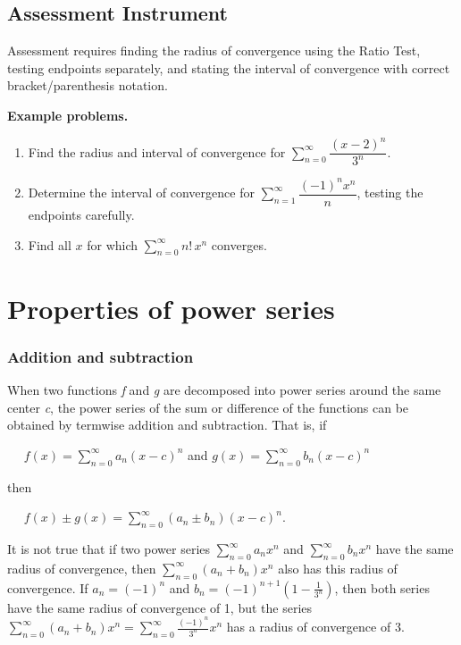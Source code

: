 \subsection{Assessment Instrument}
\label{ssec:powe-8f90}

Assessment requires finding the radius of convergence using the Ratio Test, testing endpoints separately, and stating the interval of convergence with correct bracket/parenthesis notation.

\textbf{Example problems.}

\begin{enumerate}
    \item Find the radius and interval of convergence for $\sum_{n=0}^{\infty}\dfrac{(x-2)^n}{3^n}$.
    \item Determine the interval of convergence for $\sum_{n=1}^{\infty}\dfrac{(-1)^n x^n}{n}$, testing the endpoints carefully.
    \item Find all $x$ for which $\sum_{n=0}^{\infty}n!\,x^n$ converges.
\end{enumerate}

\section{Properties of power series}
\label{sec:prop-066f}


\subsubsection{Addition and subtraction}
\label{sss:addi-546e}


When two functions \textit{f} and \textit{g} are decomposed into power series around the same center \textit{c}, the power series of the sum or difference of the functions can be obtained by termwise addition and subtraction. That is, if


$\quad$ $f(x) = \sum _{n=0}^\infty a_n (x - c)^n$ and $g(x) = \sum _{n=0}^\infty b_n (x - c)^n$


then


$\quad$ $f(x) \pm g(x) = \sum _{n=0}^\infty (a_n \pm b_n) (x - c)^n.$


It is not true that if two power series $\sum _{n=0}^\infty a_n x^n$ and $\sum _{n=0}^\infty b_n x^n$ have the same radius of convergence, then $\sum _{n=0}^\infty \left(a_n + b_n\right) x^n$ also has this radius of convergence. If $a_n = (-1)^n$ and $b_n = (-1)^{n+1} \left(1 - \frac{1}{3^n}\right)$, then both series have the same radius of convergence of 1, but the series $\sum _{n=0}^\infty \left(a_n + b_n\right) x^n = \sum _{n=0}^\infty \frac{(-1)^n}{3^n} x^n$ has a radius of convergence of 3.



